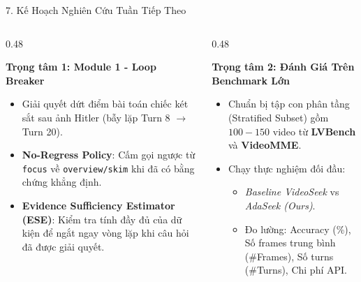 \documentclass[aspectratio=169, 10pt]{beamer}
\begin{document}
\begin{frame}{7. Kế Hoạch Nghiên Cứu Tuần Tiếp Theo}
    \begin{columns}[T]
        \begin{column}{0.48\textwidth}
            \begin{alertblock}{\textbf{Trọng tâm 1: Module 1 - Loop Breaker}}
                \begin{itemize}
                    \item Giải quyết dứt điểm bài toán chiếc két sắt sau ảnh Hitler (bẫy lặp Turn 8 $\rightarrow$ Turn 20).
                    \item \textbf{No-Regress Policy}: Cấm gọi ngược từ \texttt{focus} về \texttt{overview/skim} khi đã có bằng chứng khẳng định.
                    \item \textbf{Evidence Sufficiency Estimator (ESE)}: Kiểm tra tính đầy đủ của dữ kiện để ngắt ngay vòng lặp khi câu hỏi đã được giải quyết.
                \end{itemize}
            \end{alertblock}
        \end{column}

        \begin{column}{0.48\textwidth}
            \begin{exampleblock}{\textbf{Trọng tâm 2: Đánh Giá Trên Benchmark Lớn}}
                \begin{itemize}
                    \item Chuẩn bị tập con phân tầng (Stratified Subset) gồm $100-150$ video từ \textbf{LVBench} và \textbf{VideoMME}.
                    \item Chạy thực nghiệm đối đầu:
                    \begin{itemize}\footnotesize
                        \item \textit{Baseline VideoSeek} vs \textit{AdaSeek (Ours)}.
                        \item Đo lường: Accuracy (\%), Số frames trung bình (\#Frames), Số turns (\#Turns), Chi phí API.
                    \end{itemize}
                   
                \end{itemize}
            \end{exampleblock}
        \end{column}
    \end{columns}
\end{frame}
\end{document}
